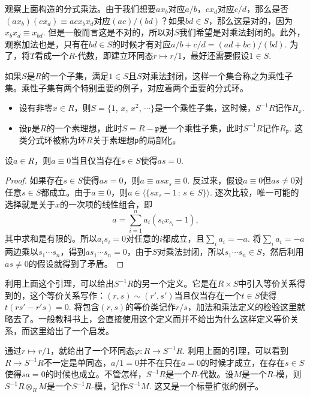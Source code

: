 观察上面构造的分式乘法。由于我们想要$ax_b$对应$a/b$，$cx_d$对应$c/d$，那么是否$(ax_{b})(cx_d)\equiv acx_bx_d$对应$(ac)/(bd)$？如果$bd\in S$，那么这是对的，因为$x_bx_d\equiv x_{bd}$. 但是一般而言这是不对的，所以对$S$我们希望是对乘法封闭的。此外，观察加法也是，只有在$bd\in S$的时候才有对应$a/b+c/d=(ad+bc)/(bd)$. 为了，将$T$看成一个$R$-代数，即建立环同态$r\mapsto r/1$，最好还需要假设$1\in S$.

如果$S$是$R$的一个子集，满足$1\in S$且$S$对乘法封闭，这样一个集合称之为乘性子集。乘性子集有两个特别重要的例子，对应着两个重要的分式环。

\begin{itemize}
	\item 设有非零$x\in R$，则$S=\{1$, $x$, $x^2$, $\cdots\}$是一个乘性子集，这时候，$S^{-1}R$记作$R_x$.

	\item 设$\mathfrak{p}$是$R$的一个素理想，此时$S=R-\mathfrak{p}$是一个乘性子集，此时$S^{-1}R$记作$R_\mathfrak{p}$. 这类分式环被称为环$R$关于素理想$\mathfrak{p}$的局部化。
\end{itemize}

\begin{lem}
设$a\in R$，则$a\equiv 0$当且仅当存在$s \in S$使得$as=0$.
\end{lem}

\begin{proof} 
	如果存在$s \in S$使得$as=0$，则$a\equiv asx_s\equiv 0$. 反过来，假设$a\equiv 0$但$as\neq 0$对任意$s\in S$都成立。由于$a\equiv 0$，则$a\in \bigl\langle\{sx_s-1\,:\, s\in S\}\bigr\rangle$. 逐次比较，唯一可能的选择就是关于$x$的一次项的线性组合，即
	\[
	a=\sum_{i=1}^n a_i(s_ix_{s_i}-1),
	\]
	其中求和是有限的。所以$a_is_i=0$对任意的$i$都成立，且$\sum_i a_i=-a$. 将$\sum_i a_i=-a$两边乘以$s_1\cdots s_n$，得到$as_1\cdots s_n=0$，由于$S$对乘法封闭，所以$s_1\cdots s_n\in S$，然后利用$as\neq 0$的假设就得到了矛盾。
\end{proof}

\para 利用上面这个引理，可以给出$S^{-1}R$的另一个定义。它是在$R\times S$中引入等价关系得到的，这个等价关系写作：$(r,s)\sim (r',s')$当且仅当存在一个$t\in S$使得$t(rs'-r's)=0$. 将包含$(r,s)$的等价类记作$r/s$，加法和乘法定义的检验这里就略去了。一般教科书上，会直接使用这个定义而并不给出为什么这样定义等价关系，而这里给出了一个启发。

通过$r\mapsto r/1$，就给出了一个环同态$\varphi:R\to S^{-1}R$. 利用上面的引理，可以看到$R\to S^{-1}R$不一定是单同态，$a/1=0$并不在只在$a=0$的时候才成立，在存在$s\in S$使得$sa=0$的时候也成立。不管怎样，$S^{-1}R$是一个$R$-代数。设$M$是一个$R$-模，则$S^{-1}R\otimes_R M$是一个$S^{-1}R$-模，记作$S^{-1}M$. 这又是一个标量扩张的例子。

